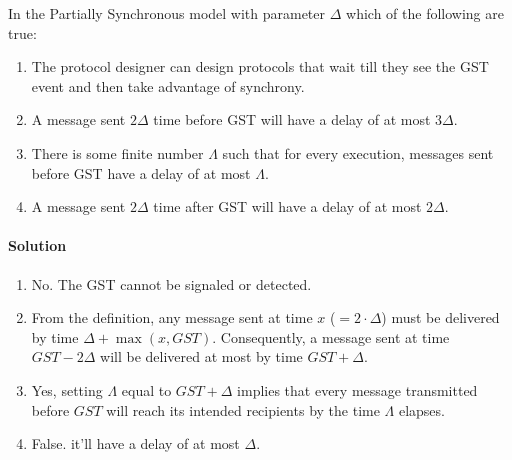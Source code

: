 \begin{xca}
    In the Partially Synchronous model with parameter $\Delta$ which of the following are true:
    \begin{enumerate}
        \item The protocol designer can design protocols that wait till they 
        see the GST event and then take advantage of synchrony.
        \item A message sent $2\Delta$ time before GST will have a delay of at most $3\Delta$.
        \item There is some finite number $\Lambda$ such that for every
         execution, messages sent before GST have a delay of at most $\Lambda$.
         \item A message sent $2\Delta$ time after GST will have a delay of at most $2\Delta$.
    \end{enumerate}
    
    \paragraph{Solution}
    \begin{enumerate}
        \item No. The GST cannot be signaled or detected.
        \item From the definition, any message sent at time $x$ ($=2\cdot \Delta$) must be delivered by
         time $\Delta + \max(x, GST)$. 
         Consequently, a message sent at time $GST - 2\Delta$ will be delivered at most by time $GST + \Delta$.
        \item Yes, setting $\Lambda$ equal to $GST + \Delta$ implies 
        that every message transmitted before $GST$ will reach its intended recipients by the time $\Lambda$ elapses.
        \item False. it'll have a delay of at most $\Delta$.
    \end{enumerate}
\end{xca}


